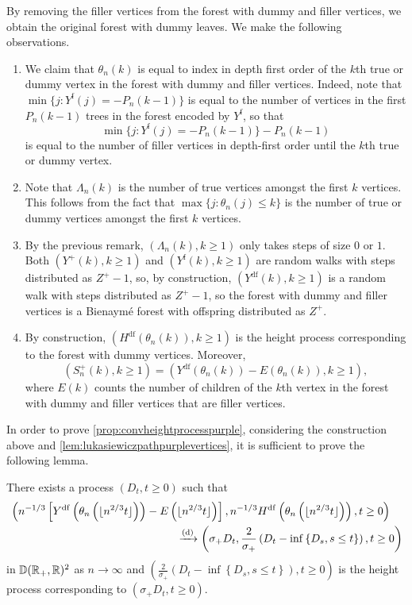 By removing the filler vertices from the forest with dummy and filler vertices, we obtain the original forest with dummy leaves. We make the following observations.
\begin{enumerate}
    \item We claim that $\theta_n(k)$ is equal to index in depth first order of the $k$th true or dummy vertex in the forest with dummy and filler vertices. Indeed, note that $\min\{j: Y^{\mathrm{f}}(j)=-P_n(k-1)\}$ is equal to the number of vertices in the first $P_n(k-1)$ trees in the forest encoded by $Y^{\mathrm{f}}$, so that $$\min\{j: Y^{\mathrm{f}}(j)=-P_n(k-1)\}-P_n(k-1)$$ is equal to the number of filler vertices in depth-first order until the $k$th true or dummy vertex. 
    \item Note that $\Lambda_n(k)$ is the number of true vertices amongst the first $k$ vertices. This follows from the fact that $\max\{j:\theta_n(j)\leq k\}$ is the number of true or dummy vertices amongst the first $k$ vertices. 
    \item By the previous remark, $(\Lambda_n(k),k\geq 1)$ only takes steps of size $0$ or $1$. Both $(Y^+(k),k\geq 1)$ and $(Y^{\mathrm{f}}(k),k\geq 1)$ are random walks with steps distributed as $Z^+-1$, so, by construction, $(Y^{\mathrm{df}}(k),k\geq 1)$ is a random walk with steps distributed as $Z^+-1$, so the forest with dummy and filler vertices is a Bienaymé forest with offspring distributed as $Z^+$.
    \item By construction, $(H^{\mathrm{df}}(\theta_n(k)),k\geq 1)$ is the height process corresponding to the forest with dummy vertices. Moreover,
   \begin{equation}\label{eq.constructionSp}(S^{+}_n(k),k\geq 1)=(Y^{\mathrm{df}}(\theta_n(k))-E(\theta_n(k)),k\geq 1),\end{equation}
    where 
    $E(k)$ counts the number of children of the $k$th vertex in the forest with dummy and filler vertices that are filler vertices.
\end{enumerate}
In order to prove \cref{prop:convheightprocesspurple}, considering the construction above and \cref{lem:lukasiewiczpathpurplevertices}, it is sufficient to prove the following lemma.
\begin{lemma}\label{lem:heightprocessblackpurplered}
There exists a process $(D_t,t\geq 0)$ such that 
\begin{align*}
    &\left(n^{-1/3}\left[Y^{\mathrm{df}}\left(\theta_n\left(\lfloor n^{2/3}t\rfloor \right)\right)-E\left(\lfloor n^{2/3}t\rfloor \right)\right], n^{-1/3}H^{\mathrm{df}}\left(\theta_n\left(\lfloor n^{2/3}t\rfloor \right)\right),t\geq 0\right)\\
    &\hspace{15em}\todist\left(\sigma_+D_t,\frac{2}{\sigma_+}\left(D_t-\inf\left\{D_s,s\leq t\right\}\right),t\geq 0\right)
\end{align*}
in ${\mathbb D}({\mathbb R}_+,{\mathbb R})^2$ as $n\to \infty$ and $\left(\frac{2}{\sigma_+}\left(D_t-\inf\left\{D_s,s\leq t\right\}\right),t\geq 0\right)$ is the height process corresponding to $(\sigma_+D_t,t\geq 0)$.
\end{lemma} 


